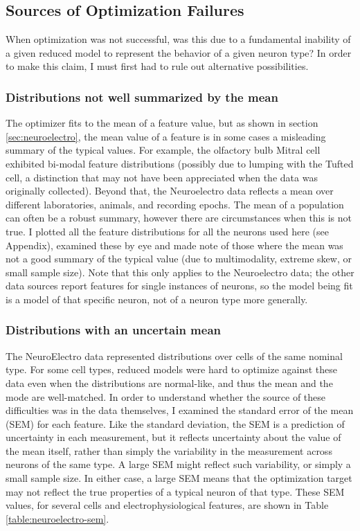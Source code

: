\subsection{Sources of Optimization Failures}
When optimization was not successful, was this due to a fundamental inability of a given reduced model to represent the behavior of a given neuron type?
In order to make this claim, I must first had to rule out alternative possibilities.

\subsubsection{Distributions not well summarized by the mean}
The optimizer fits to the mean of a feature value, but as shown in section \ref{sec:neuroelectro}, the mean value of a feature is in some cases a misleading summary of the typical values.
For example, the olfactory bulb Mitral cell exhibited bi-modal feature distributions (possibly due to lumping with the Tufted cell, a distinction that may not have been appreciated when the data was originally collected).
Beyond that, the Neuroelectro data reflects a mean over different laboratories, animals, and recording epochs. The mean of a population can often be a robust summary, however there are circumstances when this is not true.
I plotted all the feature distributions for all the neurons used here (see Appendix), examined these by eye and made note of those where the mean was not a good summary of the typical value (due to multimodality, extreme skew, or small sample size).
Note that this only applies to the Neuroelectro data; the other data sources report features for single instances of neurons, so the model being fit is a model of that specific neuron, not of a neuron type more generally.

\subsubsection{Distributions with an uncertain mean}
The NeuroElectro data represented distributions over cells of the same nominal type.
For some cell types, reduced models were hard to optimize against these data even when the distributions are normal-like, and thus the mean and the mode are well-matched.
In order to understand whether the source of these difficulties was in the data themselves, I examined the standard error of the mean (SEM) for each feature.
Like the standard deviation, the SEM is a prediction of uncertainty in each measurement, but it reflects uncertainty about the value of the mean itself, rather than simply the variability in the measurement across neurons of the same type.
A large SEM might reflect such variability, or simply a small sample size. 
In either case, a large SEM means that the optimization target may not reflect the true properties of a typical neuron of that type.
These SEM values, for several cells and electrophysiological features, are shown in Table \ref{table:neuroelectro-sem}.

